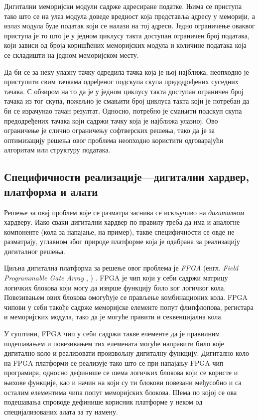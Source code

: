 \documentclass[master]{finthesis}
\makeatletter
\newcommand*{\engl}[2][\@empty]{%
    \edef\theacronym{#1}%
    (енгл. \foreignlanguage{english}{\emph{#2}%
    \ifx\theacronym\@empty \else , #1\fi})%
}
\makeatother
\begin{document}
Дигитални меморијски модули садрже адресиране податке. Њима се приступа тако што се на улаз модула доведе вредност која представља адресу у меморији, а излаз модула буде податак који се налази на тој адреси. Једно ограничење оваквог приступа је то што је у једном циклусу такта доступан ограничен број података, који зависи од броја коришћених меморијских модула и количине података која се складишти на једном меморијском месту.

Да би се за неку улазну тачку одредила тачка која је њој најближа, неопходно је приступити свим тачкама одређеног подскупа скупа предодређених суседних тачака. С обзиром на то да је у једном циклусу такта доступан ограничен број тачака из тог скупа, пожељно је смањити број циклуса такта који је потребан да би се израчунао тачан резултат. Односно, потребно је смањити подскуп скупа предодређених тачака који садржи тачку која је најближа улазној. Ово ограничење је слично ограничењу софтверских решења, тако да је за оптимизацију решења овог проблема неопходно користити одговарајући алгоритам или структуру података.

\subsection{Специфичности реализације---дигитални хардвер,\texorpdfstring{\\}{ }платформа и алати}

Решење за овај проблем које се разматра заснива се искључиво на \emph{дигиталном} хардверу. Иако сваки дигитални хардвер по правилу треба да има и аналогне компоненте (кола за напајање, на пример), такве специфичности се овде не разматрају, углавном због природе платформе која је одабрана за реализацију дигиталног решења.

Циљна дигитална платформа за решење овог проблема је \emph{FPGA} \engl{Field Programmable Gate Array}. FPGA је чип који у себи садржи матрицу логичких блокова који могу да изврше функцију било ког логичког кола. Повезивањем ових блокова омогућује се прављење комбинационих кола. FPGA чипови у себи такође садрже меморијске елементе попут флип\Hyphdash флопова, регистара и меморијских модула, тако да је могуће правити и секвенцијална кола.

У суштини, FPGA чип у себи садржи такве елементе да је правилним подешавањем и повезивањем тих елемената могуће направити било које дигитално коло и реализовати произвољну дигиталну функцију. Дигитално коло на FPGA платформи се реализује тако што се при напајању FPGA чип програмира, односно дефинише се шема логичких блокова који се користе и њихове функције, као и начин на који су ти блокови повезани међусобно и са осталим елементима чипа попут меморијских блокова. Шема по којој се ова подешавања спроводе дефинише корисник платформе у неком од специјализованих алата за ту намену.
\end{document}
